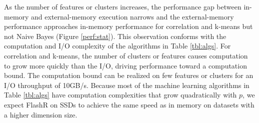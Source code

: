 As the number of features or clusters increases, the performance gap between
in-memory and external-memory execution narrows and the external-memory
performance approaches in-memory performance for correlation and k-means
but not Naive Bayes (Figure \ref{perf:stat}). This observation conforms with
the computation and I/O complexity of the algorithms in Table \ref{tbl:algs}.
For correlation and k-means, the number of clusters or features causes computation
to grow more quickly than the I/O, driving performance toward a computation bound.
The computation bound can be realized on few features or clusters for an I/O throughput of 10GB/s.
Because most of the machine learning algorithms in Table \ref{tbl:algs} have
computation complexities that grow quadratically with $p$, we expect FlashR on SSDs to
achieve the same speed as in memory on datasets with a higher dimension size.


